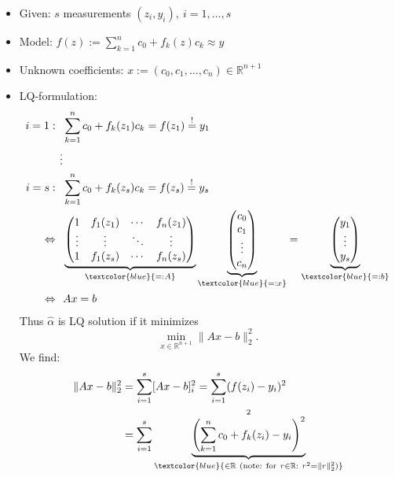 {\color{solution}
\begin{itemize}
	\item 
	Given: $s$ measurements $(z_i,y_i),~i=1,\dots,s$
	\item 
	Model: $f(z):=\sum_{k=1}^{n}c_0+f_k(z)c_k\approx y$
	\item 
	Unknown coefficients: $x:=(c_0, c_1,\dots,c_n)\in\mathbb{R}^{n+1}$
	\item 
	LQ-formulation:
	\begin{align*}
	i=1:~~&\sum_{k=1}^{n}c_0+f_k(z_1)c_k = f(z_1) \stackrel{!}{=}y_1\\
	\vdots\\
	i=s:~~&\sum_{k=1}^{n}c_0+f_k(z_s)c_k = f(z_s)\stackrel{!}{=}y_s\\
	\Leftrightarrow~~&\underbrace{\begin{pmatrix}1&f_1(z_1)&\cdots&f_n(z_1)\\\vdots&\vdots&\ddots&\vdots\\1&f_1(z_s)&\cdots&f_n(z_s)\end{pmatrix}}_{\textcolor{blue}{=:A}}\underbrace{\begin{pmatrix}c_0\\c_1\\\vdots\\c_n\end{pmatrix}}_{\textcolor{blue}{=:x}}=\underbrace{\begin{pmatrix}y_1\\\vdots\\y_s\end{pmatrix}}_{\textcolor{blue}{=:b}}\\\Leftrightarrow~~&Ax=b
	\end{align*}
	Thus $\hat{\alpha}$ is LQ solution if it minimizes 
	$$
	\min_{x\in\mathbb{R}^{n+1}}\|Ax-b\|_2^2.
	$$
	We find:
	\begin{align*}
	\|Ax-b\|_2^2 &=\sum_{i=1}^{s}[Ax-b]_i^2 =\sum_{i=1}^{s}(f(z_i)-y_i)^2\\
	&=\sum_{i=1}^{s}\underbrace{\left(\sum_{k=1}^{n}c_0+f_k(z_i)-y_i\right)^2}_{\textcolor{blue}{\in\mathbb{R}~(\text{note: for}~r\in\mathbb{R}:~r^2=\|r\|_2^2)}}^2
	\end{align*}
\end{itemize}
}